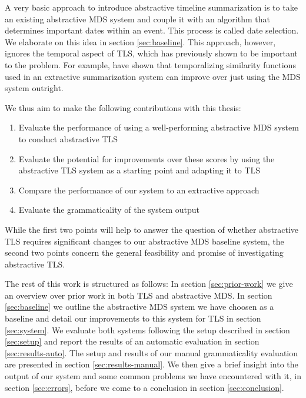 \documentclass[a4paper,BCOR=10mm]{report}
\numberwithin{lemma}{chapter}
\numberwithin{definition}{chapter}
\begin{document}
A very basic approach to introduce abstractive timeline summarization is to take an existing abstractive MDS system and couple it with an algorithm that determines important dates within an event. This process is called date selection. We elaborate on this idea in section \ref{sec:baseline}. This approach, however, ignores the temporal aspect of TLS, which has previously shown to be important to the problem. For example, \citet{markert} have shown that temporalizing similarity functions used in an extractive summarization system can improve over just using the MDS system outright.

We thus aim to make the following contributions with this thesis:

\begin{enumerate}
\item{Evaluate the performance of using a well-performing abstractive MDS system to conduct abstractive TLS}
\item{Evaluate the potential for improvements over these scores by using the abstractive TLS system as a starting point and adapting it to TLS}
\item{Compare the performance of our system to an extractive approach}
\item{Evaluate the grammaticality of the system output}
\end{enumerate}

While the first two points will help to answer the question of whether abstractive TLS requires significant changes to our abstractive MDS baseline system, the second two points concern the general feasibility and promise of investigating abstractive TLS.

The rest of this work is structured as follows:
In section \ref{sec:prior-work} we give an overview over prior work in both TLS and abstractive MDS.
In section \ref{sec:baseline} we outline the abstractive MDS system we have choosen as a baseline and detail our improvements to this system for TLS in section \ref{sec:system}.
We evaluate both systems following the setup described in 
section \ref{sec:setup} and report the results of an automatic evaluation in section \ref{sec:results-auto}.
The setup and results of our manual grammaticality evaluation are presented in section \ref{sec:results-manual}.
We then give a brief insight into the output of our system and some common problems we have encountered with it, in section \ref{sec:errors}, before we come to a conclusion in section \ref{sec:conclusion}.

\end{document}
